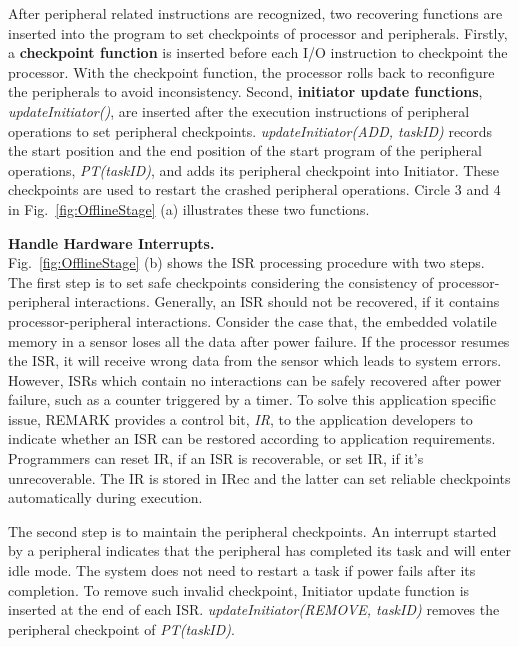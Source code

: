 %
After peripheral related instructions are recognized, two recovering functions are inserted into the program to set checkpoints of processor and peripherals. 
Firstly, a \textbf{checkpoint function} is inserted before each I/O instruction to checkpoint the processor.
With the checkpoint function, the processor rolls back to reconfigure the peripherals to avoid inconsistency.
Second, \textbf{initiator update functions}, \emph{updateInitiator()}, are inserted after the execution instructions of peripheral operations to set peripheral checkpoints.
\emph{updateInitiator(ADD, taskID)} records the start position and the end position of the start program of the peripheral operations, \emph{PT(taskID)}, and adds its peripheral checkpoint into Initiator.
These checkpoints are used to restart the crashed peripheral operations.
Circle 3 and 4 in Fig.~\ref{fig:OfflineStage} (a) illustrates these two functions.

%
\vspace{5pt}
\noindent\textbf{Handle Hardware Interrupts.} \\
Fig.~\ref{fig:OfflineStage} (b) shows the ISR processing procedure with two steps. 
The first step is to set safe checkpoints considering the consistency of processor-peripheral interactions.
Generally, an ISR should not be recovered, if it contains processor-peripheral interactions.
Consider the case that, the embedded volatile memory in a sensor loses all the data after power failure.
If the processor resumes the ISR, it will receive wrong data from the sensor which leads to system errors.
However, ISRs which contain no interactions can be safely recovered after power failure, such as a counter triggered by a timer.
To solve this application specific issue, REMARK provides a control bit, \emph{IR}, to the application developers to indicate whether an ISR can be restored according to application requirements.
Programmers can reset IR, if an ISR is recoverable, or set IR, if it's unrecoverable.
The IR is stored in IRec and the latter can set reliable checkpoints automatically during execution.

The second step is to maintain the peripheral checkpoints.
An interrupt started by a peripheral indicates that the peripheral has completed its task and will enter idle mode.
The system does not need to restart a task if power fails after its completion.
To remove such invalid checkpoint, Initiator update function is inserted at the end of each ISR.
\emph{updateInitiator(REMOVE, taskID)} removes the peripheral checkpoint of \emph{PT(taskID)}.

